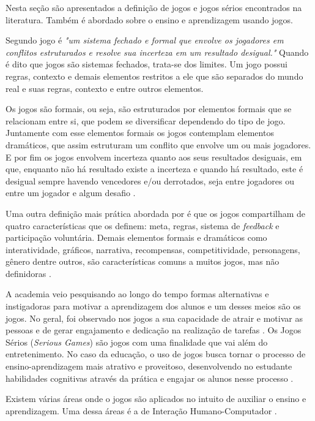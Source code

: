 Nesta seção são apresentados a definição de jogos e jogos sérios encontrados na literatura. Também é abordado sobre o ensino e aprendizagem usando jogos.

Segundo  jogo é \textit{"um sistema fechado e formal que envolve os jogadores em conflitos estruturados e resolve sua incerteza em um resultado desigual."} Quando é dito que jogos são sistemas fechados, trata-se dos limites. Um jogo possui regras, contexto e demais elementos restritos a ele que são separados do mundo real e suas regras, contexto e entre outros elementos. 

Os jogos são formais, ou seja, são estruturados por elementos formais que se relacionam entre si, que podem se diversificar dependendo do tipo de jogo. Juntamente com esse elementos formais os jogos contemplam elementos dramáticos, que assim estruturam um conflito que envolve um ou mais jogadores. E por fim os jogos envolvem incerteza quanto aos seus resultados desiguais, em que, enquanto não há resultado existe a incerteza e quando há resultado, este é desigual sempre havendo vencedores e/ou derrotados, seja entre jogadores ou entre um jogador e algum desafio \cite{Fullerton_2008}.

Uma outra definição mais prática abordada por \cite{McGonigal_Rieche_2012} é que os jogos compartilham de quatro características que os definem: meta, regras, sistema de \textit{feedback} e participação voluntária. Demais elementos formais e dramáticos como interatividade, gráficos, narrativa, recompensas, competitividade, personagens, gênero dentre outros, são características comuns a muitos jogos, mas não definidoras \cite{Vianna_Vianna_Medina_Tanaka_Krug_2013}.

A academia veio pesquisando ao longo do tempo formas alternativas e instigadoras para motivar a aprendizagem dos alunos e um desses meios são os jogos. No geral, foi observado nos jogos a sua capacidade de atrair e motivar as pessoas e de gerar engajamento e dedicação na realização de tarefas \cite{Vianna_Vianna_Medina_Tanaka_Krug_2013}. Os Jogos Sérios (\textit{Serious Games}) são jogos com uma finalidade que vai além do entretenimento. No caso da educação, o uso de jogos busca tornar o processo de ensino-aprendizagem mais atrativo e proveitoso, desenvolvendo no estudante habilidades cognitivas através da prática e engajar os alunos nesse processo \cite{sommariva, queiroz, darin}.

Existem várias áreas onde o jogos são aplicados no intuito de auxiliar o ensino e aprendizagem. Uma dessa áreas é a de Interação Humano-Computador \cite{Sales2020, Sales2020UsoTDS}.

